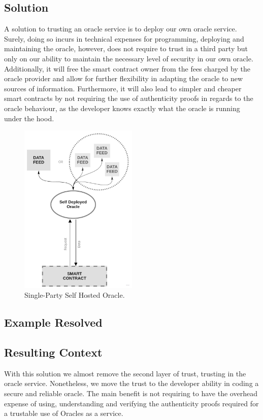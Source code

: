 \subsection{Solution}
A solution to trusting an oracle service is to deploy our own oracle service. Surely, doing so incurs in technical expenses for programming, deploying and maintaining the oracle, however, does not require to trust in a third party but only on our ability to maintain the necessary level of security in our own oracle. Additionally, it will free the smart contract owner from the fees charged by the oracle provider and allow for further flexibility in adapting the oracle to new sources of information. Furthermore, it will also lead to simpler and cheaper smart contracts by not requiring the use of authenticity proofs in regards to the oracle behaviour, as the developer knows exactly what the oracle is running under the hood.

\begin{figure}[t]
  \begin{center}
    \leavevmode
    \includegraphics[width=0.5\textwidth]{figures/oraclearch3.jpg}
    \caption{Single-Party Self Hosted Oracle.}
    \label{fig:/figures/paper-screening}
  \end{center}
\end{figure}


\subsection{Example Resolved}
\subsection{Resulting Context}
With this solution we almost remove the second layer of trust, trusting in the oracle service. Nonetheless, we move the trust to the developer ability in coding a secure and reliable oracle. The main benefit is not requiring to have the overhead expense of using, understanding and verifying the authenticity proofs required for a trustable use of Oracles as a service.

